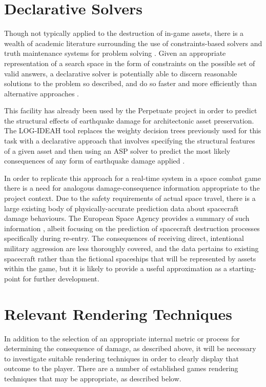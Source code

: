 \documentclass[11pt]{report}
\begin{document}
	\section{Declarative Solvers}
		Though not typically applied to the destruction of in-game assets, there is a wealth of academic literature surrounding the use of constraints-based solvers and truth maintenance systems for problem solving \cite{doyle1978truth}. Given an appropriate representation of a search space in the form of constraints on the possible set of valid answers, a declarative solver is potentially able to discern reasonable solutions to the problem so described, and do so faster and more efficiently than alternative approaches \cite{baral2003knowledge}.

		This facility has already been used by the Perpetuate project in order to predict the structural effects of earthquake damage for architectonic asset preservation. The LOG-IDEAH tool replaces the weighty decision trees previously used for this task with a declarative approach that involves specifying the structural features of a given asset and then using an ASP solver to predict the most likely consequences of any form of earthquake damage applied \cite{novelli2012log}.

		In order to replicate this approach for a real-time system in a space combat game there is a need for analogous damage-consequence information appropriate to the project context. Due to the safety requirements of actual space travel, there is a large existing body of physically-accurate prediction data about spacecraft damage behaviours. The European Space Agency provides a summary of such information \cite{klinkrad2000prediction}, albeit focusing on the prediction of spacecraft destruction processes specifically during re-entry. The consequences of receiving direct, intentional military aggression are less thoroughly covered, and the data pertains to existing spacecraft rather than the fictional spaceships that will be represented by assets within the game, but it is likely to provide a useful approximation as a starting-point for further development.

	\section{Relevant Rendering Techniques}
		In addition to the selection of an appropriate internal metric or process for determining the consequence of damage, as described above, it will be necessary to investigate suitable rendering techniques in order to clearly display that outcome to the player. There are a number of established games rendering techniques that may be appropriate, as described below.
\end{document}
